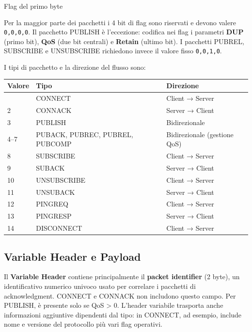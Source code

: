 \documentclass[
  italian,
  openany]{book}
\newcounter{none} %
\begin{document}
\begin{calloutnote}{Flag del primo byte}

Per la maggior parte dei pacchetti i 4 bit di flag sono riservati e
devono valere \texttt{0,0,0,0}. Il pacchetto PUBLISH è l'eccezione:
codifica nei flag i parametri \textbf{DUP} (primo bit), \textbf{QoS}
(due bit centrali) e \textbf{Retain} (ultimo bit). I pacchetti PUBREL,
SUBSCRIBE e UNSUBSCRIBE richiedono invece il valore fisso
\texttt{0,0,1,0}.

\end{calloutnote}

I tipi di pacchetto e la direzione del flusso sono:

{\def\LTcaptype{none} %
\begin{longtable}[]{@{}lll@{}}
\toprule\noalign{}
Valore & Tipo & Direzione \\
\midrule\noalign{}
\endhead
\bottomrule\noalign{}
\endlastfoot
1 & CONNECT & Client → Server \\
2 & CONNACK & Server → Client \\
3 & PUBLISH & Bidirezionale \\
4--7 & PUBACK, PUBREC, PUBREL, PUBCOMP & Bidirezionale (gestione QoS) \\
8 & SUBSCRIBE & Client → Server \\
9 & SUBACK & Server → Client \\
10 & UNSUBSCRIBE & Client → Server \\
11 & UNSUBACK & Server → Client \\
12 & PINGREQ & Client → Server \\
13 & PINGRESP & Server → Client \\
14 & DISCONNECT & Client → Server \\
\end{longtable}
}

\subsection{Variable Header e Payload}\label{variable-header-e-payload}

Il \textbf{Variable Header} contiene principalmente il \textbf{packet
identifier} (2 byte), un identificativo numerico univoco usato per
correlare i pacchetti di acknowledgment. CONNECT e CONNACK non includono
questo campo. Per PUBLISH, è presente solo se QoS \textgreater{} 0.
L'header variabile trasporta anche informazioni aggiuntive dipendenti
dal tipo: in CONNECT, ad esempio, include nome e versione del protocollo
più vari flag operativi.
\end{document}
